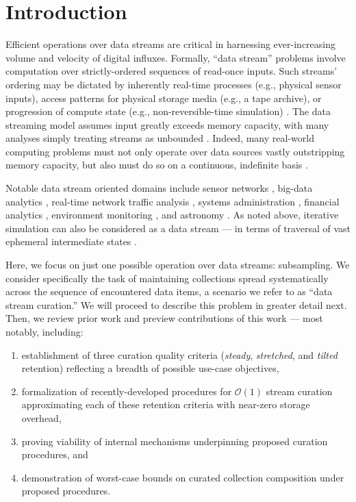 \section{Introduction} \label{sec:introduction}

Efficient operations over data streams are critical in harnessing ever-increasing volume and velocity of digital influxes.
Formally, ``data stream'' problems involve computation over strictly-ordered sequences of read-once inputs.
Such streams' ordering may be dictated by inherently real-time processes (e.g., physical sensor inputs), access patterns for physical storage media (e.g., a tape archive), or progression of compute state (e.g., non-reversible-time simulation) \citep{henzinger1998computing}.
The data streaming model assumes input greatly exceeds memory capacity, with many analyses simply treating streams as unbounded \citep{jiang2006research}.
Indeed, many real-world computing problems must not only operate over data sources vastly outstripping memory capacity, but also must do so on a continuous, indefinite basis \citep{cordeiro2016online}.

Notable data stream oriented domains include sensor networks \citep{elnahrawy2003research}, big-data analytics \citep{he2010comet}, real-time network traffic analysis \citep{johnson2005streams,muthukrishnan2005data}, systems administration \citep{fischer2012real}, financial analytics \citep{rajeshwari2016real,agarwal2009faster}, environment monitoring \citep{hill2009real}, and astronomy \citep{graham2012data}.
As noted above, iterative simulation can also be considered as a data stream --- in terms of traversal of vast ephemeral intermediate states \citep{abdulla2004simulation,schutzel2014stream}.

Here, we focus on just one possible operation over data streams: subsampling.
We consider specifically the task of maintaining collections spread systematically across the sequence of encountered data items, a scenario we refer to as ``data stream curation.''
We will proceed to describe this problem in greater detail next.
Then, we review prior work and preview contributions of this work --- most notably, including:
\begin{enumerate}
\item establishment of three curation quality criteria (\textit{steady}, \textit{stretched}, and \textit{tilted} retention) reflecting a breadth of possible use-case objectives,
\item formalization of recently-developed procedures for $\mathcal{O}(1)$ stream curation approximating each of these retention criteria with near-zero storage overhead,
\item proving viability of internal mechanisms underpinning proposed curation procedures, and
\item demonstration of worst-case bounds on curated collection composition under proposed procedures.
\end{enumerate}






